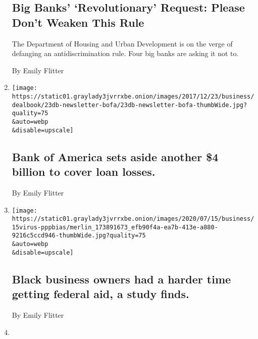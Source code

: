\begin{enumerate}
  \hypertarget{big-banks-revolutionary-request-please-dont-weaken-this-rule}{%
  \subsection{Big Banks' `Revolutionary' Request: Please Don't Weaken
  This
  Rule}\label{big-banks-revolutionary-request-please-dont-weaken-this-rule}}

  The Department of Housing and Urban Development is on the verge of
  defanging an antidiscrimination rule. Four big banks are asking it not
  to.

  By Emily Flitter
\item
  \href{/2020/07/16/business/bank-of-america-sets-aside-another-4-billion-to-cover-loan-losses.html}{}

  \texttt{[image: https://static01.graylady3jvrrxbe.onion/images/2017/12/23/business/dealbook/23db-newsletter-bofa/23db-newsletter-bofa-thumbWide.jpg?quality=75\\\&auto=webp\\\&disable=upscale]}

  \hypertarget{bank-of-america-sets-aside-another-4-billion-to-cover-loan-losses}{%
  \subsection{Bank of America sets aside another \$4 billion to cover
  loan
  losses.}\label{bank-of-america-sets-aside-another-4-billion-to-cover-loan-losses}}

  By Emily Flitter
\item
  \href{/live/2020/07/15/business/stock-market-today-coronavirus/black-business-owners-had-a-harder-time-getting-federal-aid-a-study-finds}{}

  \texttt{[image: https://static01.graylady3jvrrxbe.onion/images/2020/07/15/business/15virus-pppbias/merlin\_173891673\_efb90f4a-ea7b-413e-a880-9216c5ccd946-thumbWide.jpg?quality=75\\\&auto=webp\\\&disable=upscale]}

  \hypertarget{black-business-owners-had-a-harder-time-getting-federal-aid-a-study-finds}{%
  \subsection{Black business owners had a harder time getting federal
  aid, a study
  finds.}\label{black-business-owners-had-a-harder-time-getting-federal-aid-a-study-finds}}

  By Emily Flitter
\item
  \href{/2020/07/15/business/paycheck-protection-program-bias.html}{}


\end{enumerate}
